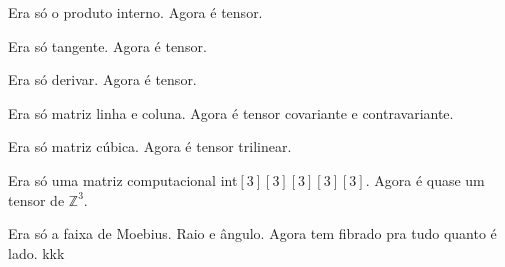 \documentclass[10pt,a4paper]{article}
\begin{document}
		\vspace{120mm}

		Era s\'o o produto interno. Agora \'e tensor.

		Era s\'o tangente. Agora \'e tensor.

		Era s\'o derivar. Agora \'e tensor.

		Era s\'o matriz linha e coluna. Agora \'e tensor covariante e contravariante.

		Era s\'o matriz c\'ubica. Agora \'e tensor trilinear.

		Era s\'o uma matriz computacional int$[3][3][3][3][3]$. Agora \'e quase um tensor de $\mathbb{Z}^3$.

		Era s\'o a faixa de Moebius. Raio e \^angulo. Agora tem fibrado pra tudo quanto \'e lado. kkk
\end{document}
